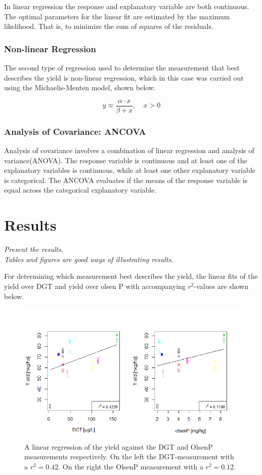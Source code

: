 \documentclass[11pt, fleqn, titlepage]{article}
\begin{document}
\noindent
In linear regression the response and explanatory variable are both continuous. The optimal parameters for the linear fit are estimated by the maximum likelihood. That is, to minimize the sum of squares of the residuals. 

\subsubsection*{Non-linear Regression}
The second type of regression used to determine the measurement that best describes the yield is non-linear regression, which in this case was carried out using the Michaelis-Menten model, shown below.

\[y \approx \frac{\alpha \cdot x}{\beta + x}, \quad x > 0 \]


\subsubsection*{Analysis of Covariance: ANCOVA}
Analysis of covariance involves a combination of linear regression and analysis of variance(ANOVA). The response variable is continuous and at least one of the explanatory variables is continuous, while at least one other explanatory variable is categorical. The ANCOVA evaluates if the means of the response variable is equal across the categorical explanatory variable.  \cite{statbog} 


\section{Results}
\textit{Present the results. \\ Tables and figures are good ways of illustrating results.}

For determining which measurement best describes the yield, the linear fits of the yield over DGT and yield over olsen P with accompanying $r^2$-values are shown below.

\begin{figure}[H]
	\centering
	\includegraphics[width=0.7\linewidth]{billeder/Linearfit.png}
	\caption{A linear regression of the yield against the DGT and OlsenP measurements respectively. On the left the DGT-measurement with a $ r^2 = 0.42 $. On the right the OlsenP measurement with a $ r^2 = 0.12 $.}
	\label{fig:linearfit}
\end{figure}
\end{document}
